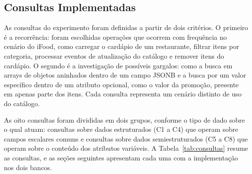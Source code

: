\subsection{Consultas Implementadas}
\label{sec:consultas-implementadas}

As consultas do experimento foram definidas a partir de dois critérios. O primeiro é a 
recorrência: foram escolhidas operações que ocorrem com frequência no cenário do iFood, 
como carregar o cardápio de um restaurante, filtrar itens por categoria, processar eventos de 
atualização do catálogo e remover itens do cardápio. O segundo é a investigação de possíveis 
gargalos: como a busca em arrays de objetos aninhados dentro de um campo JSONB e a 
busca por um valor específico dentro de um atributo opcional, 
como o valor da promoção, presente em apenas parte dos itens. Cada consulta 
representa um cenário distinto de uso do catálogo.

As oito consultas foram divididas em dois grupos, conforme o tipo de dado sobre o qual atuam: 
consultas sobre dados estruturados (C1 a C4) que operam sobre campos escalares comuns e
consultas sobre dados semiestruturados (C5 a C8) que operam sobre o conteúdo dos atributos 
variáveis. A Tabela~\ref{tab:consultas} resume as consultas, e as seções seguintes apresentam 
cada uma com a implementação nos dois bancos. 

